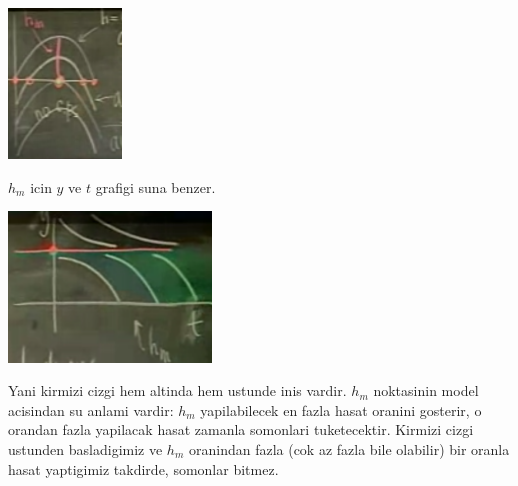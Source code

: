 \documentclass[12pt,fleqn]{article}
\begin{document}
\includegraphics[height=4cm]{5_11.png}

$h_m$ icin $y$ ve $t$ grafigi suna benzer. 

\includegraphics[height=4cm]{5_12.png}

Yani kirmizi cizgi hem altinda hem ustunde inis vardir. $h_m$ noktasinin
model acisindan su anlami vardir: $h_m$ yapilabilecek en fazla hasat
oranini gosterir, o orandan fazla yapilacak hasat zamanla somonlari
tuketecektir. Kirmizi cizgi ustunden basladigimiz ve $h_m$ oranindan fazla
(cok az fazla bile olabilir) bir oranla hasat yaptigimiz takdirde, somonlar
bitmez.
\end{document}
